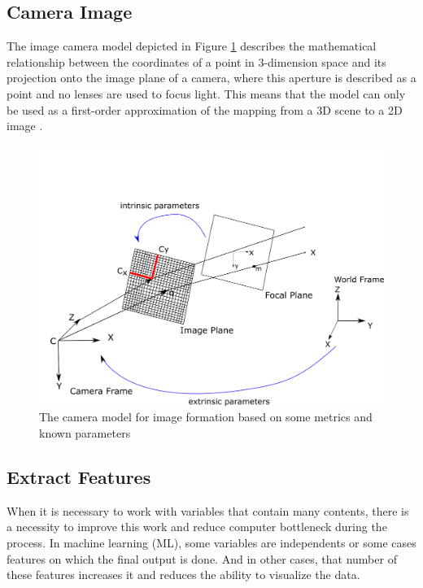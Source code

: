\subsection{Camera Image}

The image camera model depicted in Figure \ref{fig:image_formation} describes the mathematical relationship between the coordinates of a point in 3-dimension space and its projection onto
the image plane of a camera, where this aperture is described as a point and no lenses are used to focus light. This means that the model can only be used as a first-order approximation of the mapping from a 3D scene to a 2D image \cite{forsyth2002computer}.




\begin{figure}[H]
\centering
\includegraphics[width=\textwidth]{imagens/image_formation.png}
\caption{The camera model for image formation based on some metrics and known parameters}
\label{fig:image_formation}
\end{figure}

\subsection{Extract Features}

When it is necessary to work with variables that contain many contents, there is a necessity to improve this work and reduce computer bottleneck during the process. In machine learning (ML), some variables are independents or some cases features on which the final output is done. And in other cases, that number of these features increases it and reduces the ability to visualize the data. 

